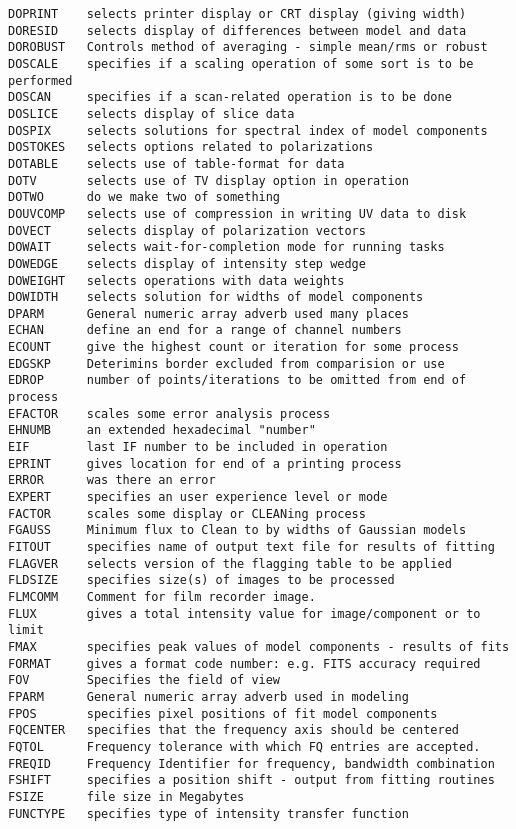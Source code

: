 \begin{verbatim}
DOPRINT    selects printer display or CRT display (giving width)
DORESID    selects display of differences between model and data
DOROBUST   Controls method of averaging - simple mean/rms or robust
DOSCALE    specifies if a scaling operation of some sort is to be performed
DOSCAN     specifies if a scan-related operation is to be done
DOSLICE    selects display of slice data
DOSPIX     selects solutions for spectral index of model components
DOSTOKES   selects options related to polarizations
DOTABLE    selects use of table-format for data
DOTV       selects use of TV display option in operation
DOTWO      do we make two of something
DOUVCOMP   selects use of compression in writing UV data to disk
DOVECT     selects display of polarization vectors
DOWAIT     selects wait-for-completion mode for running tasks
DOWEDGE    selects display of intensity step wedge
DOWEIGHT   selects operations with data weights
DOWIDTH    selects solution for widths of model components
DPARM      General numeric array adverb used many places
ECHAN      define an end for a range of channel numbers
ECOUNT     give the highest count or iteration for some process
EDGSKP     Deterimins border excluded from comparision or use
EDROP      number of points/iterations to be omitted from end of process
EFACTOR    scales some error analysis process
EHNUMB     an extended hexadecimal "number"
EIF        last IF number to be included in operation
EPRINT     gives location for end of a printing process
ERROR      was there an error
EXPERT     specifies an user experience level or mode
FACTOR     scales some display or CLEANing process
FGAUSS     Minimum flux to Clean to by widths of Gaussian models
FITOUT     specifies name of output text file for results of fitting
FLAGVER    selects version of the flagging table to be applied
FLDSIZE    specifies size(s) of images to be processed
FLMCOMM    Comment for film recorder image.
FLUX       gives a total intensity value for image/component or to limit
FMAX       specifies peak values of model components - results of fits
FORMAT     gives a format code number: e.g. FITS accuracy required
FOV        Specifies the field of view
FPARM      General numeric array adverb used in modeling
FPOS       specifies pixel positions of fit model components
FQCENTER   specifies that the frequency axis should be centered
FQTOL      Frequency tolerance with which FQ entries are accepted.
FREQID     Frequency Identifier for frequency, bandwidth combination
FSHIFT     specifies a position shift - output from fitting routines
FSIZE      file size in Megabytes
FUNCTYPE   specifies type of intensity transfer function

\end{verbatim}
